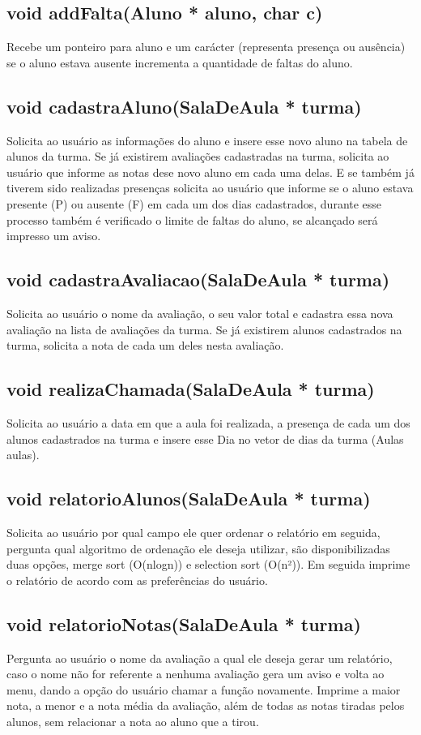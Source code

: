 \documentclass{article}
\begin{document}
\subsection{void addFalta(Aluno * aluno, char c)}
Recebe um ponteiro para aluno e um carácter (representa presença ou ausência) se o aluno estava ausente incrementa a quantidade de faltas do aluno.

\subsection{void cadastraAluno(SalaDeAula * turma)}
Solicita ao usuário  as informações do aluno e insere esse novo aluno na tabela de alunos da turma. Se já existirem avaliações cadastradas na turma, solicita ao usuário que informe as notas dese novo aluno em cada uma delas. E se também já tiverem sido realizadas presenças solicita ao usuário que informe se o aluno estava presente (P) ou ausente (F) em cada um dos dias cadastrados, durante esse processo também é verificado o limite de faltas do aluno, se alcançado será impresso um aviso.

\subsection{void cadastraAvaliacao(SalaDeAula * turma)}
Solicita ao usuário o nome da avaliação, o seu valor total e cadastra essa nova avaliação na lista de avaliações da turma. Se já existirem alunos cadastrados na turma, solicita a nota de cada um deles nesta avaliação.

\subsection{void realizaChamada(SalaDeAula * turma)}
Solicita ao usuário a data em que a aula foi realizada, a presença de cada um dos alunos cadastrados na turma e insere esse Dia no vetor de dias da turma (Aulas aulas).

\subsection{void relatorioAlunos(SalaDeAula * turma)}
Solicita ao usuário por qual campo ele quer ordenar o relatório em seguida, pergunta qual algoritmo de ordenação ele deseja utilizar, são disponibilizadas duas opções, merge sort (O(nlogn)) e selection sort (O(n²)). Em seguida imprime o relatório de acordo com as preferências do usuário.


\subsection{void relatorioNotas(SalaDeAula *  turma)}
Pergunta ao usuário o nome da avaliação a qual ele deseja gerar um relatório, caso o nome não for referente a nenhuma avaliação gera um aviso e volta ao menu, dando a opção do usuário chamar a função novamente. Imprime a maior nota, a menor e a nota média da avaliação, além de todas as notas tiradas pelos alunos, sem relacionar a nota ao aluno que a tirou.
\end{document}
